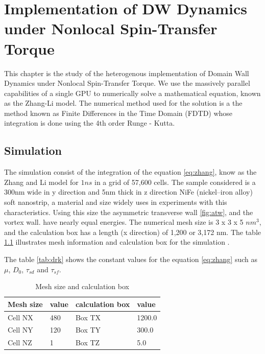 
\chapter{Implementation of DW Dynamics under Nonlocal Spin-Transfer Torque} %

\label{Implementation of DW Dynamics under Nonlocal Spin-Transfer Torque} %


This chapter is the study of the heterogenous implementation of Domain Wall Dynamics under Nonlocal Spin-Transfer Torque. We use the massively parallel capabilities of a single GPU to numerically solve a mathematical equation, known as the Zhang-Li model. The numerical method used for the solution is a the method known as Finite Differences in the Time Domain (FDTD) whose integration is done using the  4th order Runge - Kutta.





\section{Simulation}



The simulation consist of the integration of the equation \ref{eq:zhang}, know as the Zhang and Li model for $1ns$ in a grid of 57,600 cells. The sample considered is a 300nm wide in y direction and 5nm thick in z direction NiFe (nickel–iron alloy) soft nanostrip, a material and size widely uses in experiments with this characteristics. Using this size the asymmetric transverse wall \ref{fig:atw}, and the vortex wall. have nearly equal energies. The numerical mesh size is 3 x 3 x 5 $nm^3$, and the calculation box has a length (x direction) of 1,200 or 3,172 nm. The table \ref{tab:mesh} illustrates mesh information and calculation box for the simulation \cite{claudio}.

The table \ref{tab:drk} shows the constant values for the equation \ref{eq:zhang} such as $\mu$, $D_{0}$, $\tau_{sd}$ and $\tau_{sf}$.

\begin{table}[h]
\centering
\begin{tabular}{| l | l | l | l |}
\hline
Mesh size & value & calculation box & value \\
\hline
Cell NX & 480 & Box TX  & 1200.0   \\
\hline
Cell NY & 120 & Box TY  & 300.0  \\
\hline
Cell NZ &	1 & Box TZ  & 5.0   \\
\hline
\end{tabular}
\caption{Mesh size and calculation box}
\label{tab:mesh}
\end{table}

